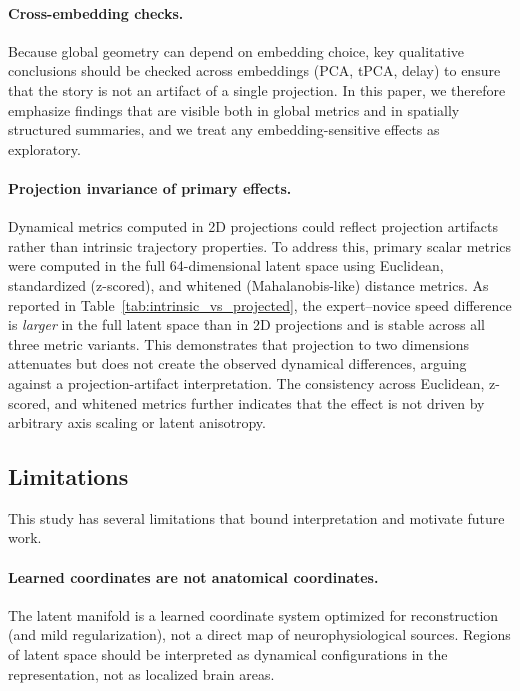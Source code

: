 \documentclass[5p,twocolumn,authoryear]{elsarticle}
\begin{document}
\paragraph{Cross-embedding checks.}
Because global geometry can depend on embedding choice, key qualitative conclusions should be checked across embeddings (PCA, tPCA, delay) to ensure that the story is not an artifact of a single projection. In this paper, we therefore emphasize findings that are visible both in global metrics and in spatially structured summaries, and we treat any embedding-sensitive effects as exploratory.

\paragraph{Projection invariance of primary effects.}
Dynamical metrics computed in 2D projections could reflect projection artifacts rather than intrinsic trajectory properties. To address this, primary scalar metrics were computed in the full 64-dimensional latent space using Euclidean, standardized (z-scored), and whitened (Mahalanobis-like) distance metrics. As reported in Table~\ref{tab:intrinsic_vs_projected}, the expert--novice speed difference is \emph{larger} in the full latent space than in 2D projections and is stable across all three metric variants. This demonstrates that projection to two dimensions attenuates but does not create the observed dynamical differences, arguing against a projection-artifact interpretation. The consistency across Euclidean, z-scored, and whitened metrics further indicates that the effect is not driven by arbitrary axis scaling or latent anisotropy.

\subsection{Limitations}
\label{sec:limitations}
This study has several limitations that bound interpretation and motivate future work.

\paragraph{Learned coordinates are not anatomical coordinates.}
The latent manifold is a learned coordinate system optimized for reconstruction (and mild regularization), not a direct map of neurophysiological sources. Regions of latent space should be interpreted as dynamical configurations in the representation, not as localized brain areas.
\end{document}
